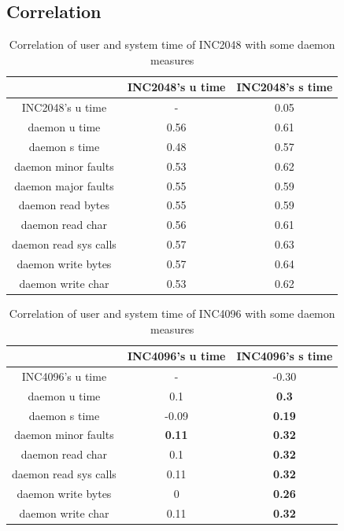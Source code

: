 \clearpage
\pagebreak

\subsection{Correlation}

\begin{table}[h]
\begin{center}
\begin{tabular}{|c|c|c|} \hline
 						   & INC2048's u time & INC2048's s time\\ \hline
INC2048's u time  &	 -  &  0.05\\ \hline					
daemon u time & 0.56 & 0.61\\ \hline
daemon s time & 0.48 & 0.57\\ \hline
daemon minor faults &  0.53 & 0.62\\ \hline
daemon major faults & 0.55 & 0.59 \\ \hline
daemon read bytes & 0.55 & 0.59 \\ \hline
daemon read char & 0.56 & 0.61\\ \hline
daemon read sys calls & 0.57 & 0.63\\ \hline
daemon write bytes & 0.57 &  0.64\\ \hline
daemon write char & 0.53 & 0.62\\ \hline
\end{tabular}
\end{center}
\vspace{-.2in}
\caption{Correlation of user and system time of INC2048 with some daemon measures\label{tab:corr_table2}}
\end{table}

\begin{table}[h]
\begin{center}
\begin{tabular}{|c|c|c|} \hline
 						   & INC4096's u time & INC4096's s time\\ \hline
INC4096's u time  &	 -  & -0.30 \\ \hline					
daemon u time & 0.1 & {\bf 0.3} \\ \hline
daemon s time & -0.09 & {\bf 0.19} \\ \hline
daemon minor faults & {\bf 0.11} & {\bf 0.32} \\ \hline
daemon read char & 0.1 & {\bf 0.32} \\ \hline
daemon read sys calls & 0.11 & {\bf 0.32} \\ \hline
daemon write bytes & 0 & {\bf 0.26} \\ \hline
daemon write char & 0.11 & {\bf 0.32}\\ \hline
\end{tabular}
\end{center}
\vspace{-.2in}
\caption{Correlation of user and system time of INC4096 with some daemon measures\label{tab:corr_table}}
\end{table}

